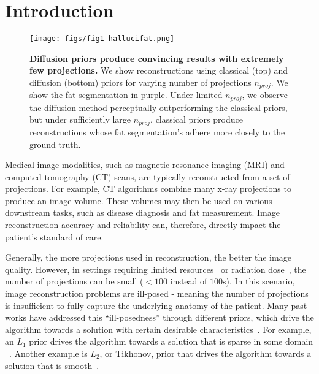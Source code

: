 \section{Introduction}
\label{sec:intro}

\begin{figure*}[!t]
    \centering
    \texttt{[image: figs/fig1-hallucifat.png]}
    \caption{\textbf{Diffusion priors produce convincing results with extremely few projections. }We show reconstructions using classical (top) and diffusion (bottom) priors for varying number of projections $n_{proj}$. We show the fat segmentation in purple. Under limited $n_{proj}$, we observe the diffusion method perceptually outperforming the classical priors, but under sufficiently large $n_{proj}$, classical priors produce reconstructions whose fat segmentation's adhere more closely to the ground truth.}
    \label{fig:halluci-fat}
\end{figure*}

Medical image modalities, such as magnetic resonance imaging (MRI) and computed tomography (CT) scans, are typically reconstructed from a set of projections. For example, CT algorithms combine many x-ray projections to produce an image volume. These volumes may then be used on various downstream tasks, such as disease diagnosis and fat measurement. Image reconstruction accuracy and reliability can, therefore, directly impact the patient's standard of care.

Generally, the more projections used in reconstruction, the better the image quality. However, in settings requiring limited resources~\cite{court2023addressing} or radiation dose~\cite{rampinelli2012low}, the number of projections can be small ($<100$ instead of $100$s).
In this scenario, image reconstruction problems are ill-posed - meaning the number of projections is insufficient to fully capture the underlying anatomy of the patient.
Many past works have addressed this ``ill-posedness'' through different priors, which drive the algorithm towards a solution with certain desirable characteristics~\cite{sun2024difr3ct}.
For example, an $L_1$ prior drives the algorithm towards a solution that is sparse in some domain ~\cite{zhang2018regularization}.
Another example is $L_2$, or Tikhonov, prior that drives the algorithm towards a solution that is smooth~\cite{zhang2018regularization}.

